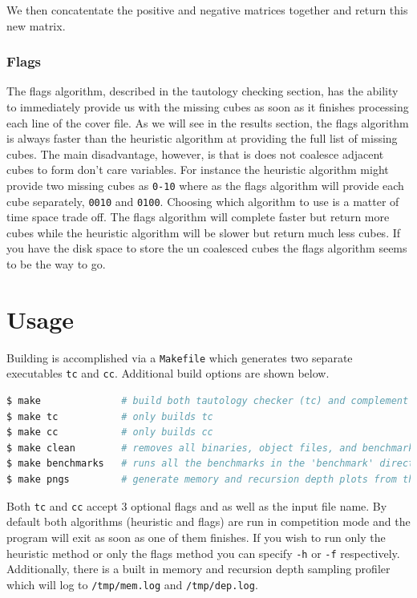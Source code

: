 \documentclass[10pt]{article}
\begin{document}
            We then concatentate the positive and negative matrices together and
            return this new matrix.

            \newpage
        \subsubsection{Flags}

            The flags algorithm, described in the tautology checking section,
            has the ability to immediately provide us with the missing cubes as
            soon as it finishes processing each line of the cover file. As we
            will see in the results section, the flags algorithm is always
            faster than the heuristic algorithm at providing the full list of
            missing cubes. The main disadvantage, however, is that is does not
            coalesce adjacent cubes to form don't care variables. For instance
            the heuristic algorithm might provide two missing cubes as
            \texttt{0-10} where as the flags algorithm will provide each cube
            separately, \texttt{0010} and \texttt{0100}. Choosing which
            algorithm to use is a matter of time space trade off. The flags
            algorithm will complete faster but return more cubes while the
            heuristic algorithm will be slower but return much less cubes. If
            you have the disk space to store the un coalesced cubes the flags
            algorithm seems to be the way to go.

\newpage
\section{Usage}

Building is accomplished via a \texttt{Makefile} which generates two separate
executables \texttt{tc} and \texttt{cc}. Additional build options are shown
below.

\begin{lstlisting}[language=bash]
$ make              # build both tautology checker (tc) and complement checker (cc)
$ make tc           # only builds tc
$ make cc           # only builds cc
$ make clean        # removes all binaries, object files, and benchmark results
$ make benchmarks   # runs all the benchmarks in the 'benchmark' directory
$ make pngs         # generate memory and recursion depth plots from the benchmark results
\end{lstlisting}

Both \texttt{tc} and \texttt{cc} accept 3 optional flags and as well as the
input file name.  By default both algorithms (heuristic and flags) are run in
competition mode and the program will exit as soon as one of them finishes. If
you wish to run only the heuristic method or only the flags method you can
specify \texttt{-h} or \texttt{-f} respectively. Additionally, there is a built
in memory and recursion depth sampling profiler which will log to
\texttt{/tmp/mem.log} and \texttt{/tmp/dep.log}.
\end{document}
